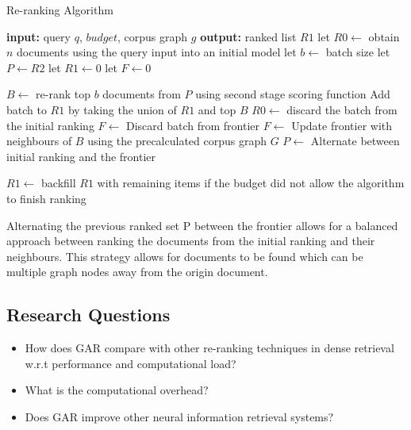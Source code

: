 \documentclass[sigconf,authorversion,nonacm]{acmart}
\begin{document}
\begin{algorithm}
	\caption{Re-ranking Algorithm}
	\begin{algorithmic}[1]
		\STATE \textbf{input:} query \(q\), \(budget\), corpus graph \(g\)
		\STATE \textbf{output:} ranked list \(R1\)
		\STATE let \(R0 \leftarrow\) obtain \(n\) documents using the query input into an initial model
		\STATE let \(b \leftarrow\) batch size
		\STATE let \(P \leftarrow R2 \)
		\STATE let \(R1 \leftarrow 0 \)
		\STATE let \(F \leftarrow 0 \)

		\STATE \(B \leftarrow\) re-rank top \(b\) documents from \(P\) using second stage scoring function
		\STATE Add batch to \(R1\) by taking the union of \(R1\) and top \(B\)
		\STATE \(R0 \leftarrow\) discard the batch from the initial ranking
		\STATE \(F \leftarrow\) Discard batch from frontier
		\STATE \(F \leftarrow\) Update frontier with neighbours of \(B\) using the precalculated corpus graph \(G\)
		\STATE \(P \leftarrow\) Alternate between initial ranking and the frontier
		\ENDWHILE

		\STATE \(R1 \leftarrow\) backfill \(R1\) with remaining items if the budget did not allow the algorithm to finish ranking
	\end{algorithmic}
\end{algorithm}

Alternating the previous ranked set P between the frontier allows for a balanced approach between
ranking the documents from the initial ranking and their neighbours. This strategy allows for
documents to be found which can be multiple graph nodes away from the origin document.

\subsection{Research Questions}

\begin{itemize}

	\item How does GAR compare with other re-ranking techniques in dense retrieval w.r.t
	      performance and computational load?

	\item What is the computational overhead?

	\item Does GAR improve other neural information retrieval systems?

\end{itemize}
\end{document}
